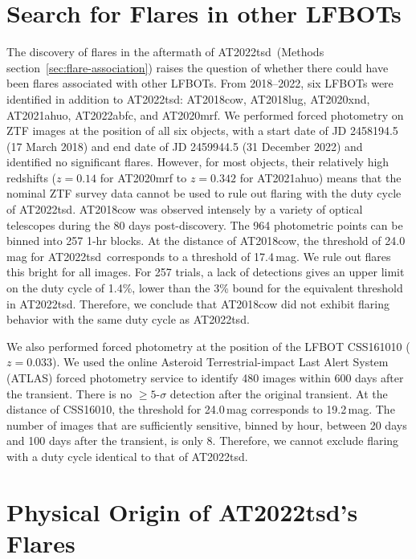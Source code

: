 \documentclass{nature_plusfigure}
\newcommand{\at}{AT2022tsd}
\begin{document}
\begin{methods}
\section{Search for Flares in other LFBOTs}
\label{sec:flare-search}

The discovery of flares in the aftermath of \at\ (Methods section~\ref{sec:flare-association}) raises the question of whether there could have been flares associated with other LFBOTs. 
From 2018--2022, six LFBOTs were identified in addition to \at: AT2018cow\cite{Prentice2018}, AT2018lug\cite{Ho2020_Koala}, AT2020xnd\cite{Perley2021}, AT2021ahuo, AT2022abfc\cite{Ho2022_AT2022abfc},  
and AT2020mrf\cite{Yao2022}. 
We performed forced photometry on ZTF images at the position of all six objects, with a start date of JD 2458194.5 (17 March 2018) and end date of JD 2459944.5 (31 December 2022) and identified no significant flares. 
However, for most objects, their relatively high redshifts ($z=0.14$ for AT2020mrf\cite{Yao2022} to $z=0.342$ for AT2021ahuo) means that the nominal ZTF survey data cannot be used to rule out flaring with the duty cycle of \at.
AT2018cow was observed intensely by a variety of optical telescopes during the 80 days post-discovery\cite{Perley2019}. The 964 photometric points can be binned into 257 1-hr blocks. At the distance of AT2018cow, the threshold of 24.0\,mag for \at\ corresponds to a threshold of 17.4\,mag. We rule out flares this bright for all images. For 257 trials, a lack of detections gives an upper limit on the duty cycle of 1.4\%, lower than the 3\% bound for the equivalent threshold in \at. Therefore, we conclude that AT2018cow did not exhibit flaring behavior with the same duty cycle as \at.

We also performed forced photometry at the position of the LFBOT CSS161010\cite{Coppejans2020} ($z=0.033$). 
We used the online Asteroid Terrestrial-impact Last Alert System (ATLAS)\cite{Tonry2018,Smith2020} forced photometry service\cite{Shingles2021} to identify 480 images within 600 days after the transient. There is no $\geq5$-$\sigma$ detection after the original transient. At the distance of CSS16010, the threshold for 24.0\,mag corresponds to 19.2\,mag. The number of images that are sufficiently sensitive, binned by hour, between 20 days and 100 days after the transient, is only 8. Therefore, we cannot exclude flaring with a duty cycle identical to that of \at.

\section{Physical Origin of \at's Flares}
\label{sec:flare-origin}


\end{methods}
\end{document}

